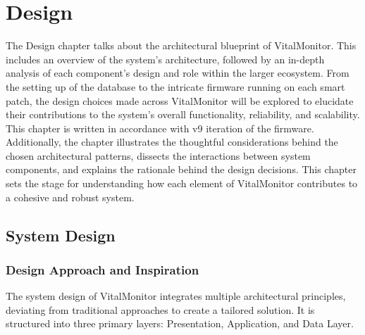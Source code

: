 \chapter{Design}

The Design chapter talks about the architectural blueprint of VitalMonitor. This includes an overview of the system's architecture, followed by an in-depth analysis of each component's design and role within the larger ecosystem. From the setting up of the database to the intricate firmware running on each smart patch, the design choices made across VitalMonitor will be explored to elucidate their contributions to the system's overall functionality, reliability, and scalability. This chapter is written in accordance with v9 iteration of the firmware.\\

Additionally, the chapter illustrates the thoughtful considerations behind the chosen architectural patterns, dissects the interactions between system components, and explains the rationale behind the design decisions. This chapter sets the stage for understanding how each element of VitalMonitor contributes to a cohesive and robust system.

\section{System Design}
\subsection{Design Approach and Inspiration}

\noindent The system design of VitalMonitor integrates multiple architectural principles, deviating from traditional approaches to create a tailored solution. It is structured into three primary layers: Presentation, Application, and Data Layer.

